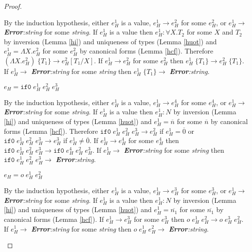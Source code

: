 \begin{hps}
\begin{proof}
\begin{hps-case-8}
By the induction hypothesis, either $e_{H}^{1}$ is a value, $e_{H}^{1}\rightarrow e_{H}^{2}$ for some $e_{H}^{2}$, or $e_{H}^{1}\rightarrow$ \emph{\textbf{Error}:\;string} for some \emph{string}.  If $e_{H}^{1}$ is a value then $e_{H}^{1}:\forall X.T_{2}$ for some $X$ and $T_{2}$ by inversion (Lemma \ref{hi}) and uniqueness of types (Lemma \ref{huot}) and $e_{H}^{1}=\Lambda X.e_{H}^{2}$ for some $e_{H}^{2}$ by canonical forms (Lemma \ref{hcf}).  Therefore $(\Lambda X.e_{H}^{2})\;\lbrace T_{1}\rbrace\rightarrow e_{H}^{2}[T_{1}/X]$.  If $e_{H}^{1}\rightarrow e_{H}^{2}$ for some $e_{H}^{2}$ then $e_{H}^{1}\;\lbrace T_{1}\rbrace\rightarrow e_{H}^{2}\;\lbrace T_{1}\rbrace$.  If $e_{H}^{1}\rightarrow$ \emph{\textbf{Error}:\;string} for some \emph{string} then $e_{H}^{1}\;\lbrace T_{1}\rbrace\rightarrow$ \emph{\textbf{Error}:\;string}.
\end{hps-case-8}
\begin{hps-case-9}
$e_{H}=\mathtt{if0}\;e_{H}^{1}\;e_{H}^{2}\;e_{H}^{3}$

By the induction hypothesis, either $e_{H}^{1}$ is a value, $e_{H}^{1}\rightarrow e_{H}^{4}$ for some $e_{H}^{4}$, or $e_{H}^{1}\rightarrow$ \emph{\textbf{Error}:\;string} for some \emph{string}.  If $e_{H}^{1}$ is a value then $e_{H}^{1}:N$ by inversion (Lemma \ref{hi}) and uniqueness of types (Lemma \ref{huot}) and $e_{H}^{1}=\overline{n}$ for some $\overline{n}$ by canonical forms (Lemma \ref{hcf}).  Therefore $\mathtt{if0}\;e_{H}^{1}\;e_{H}^{2}\;e_{H}^{3}\rightarrow e_{H}^{2}$ if $e_{H}^{1}=\overline{0}$ or $\mathtt{if0}\;e_{H}^{1}\;e_{H}^{2}\;e_{H}^{3}\rightarrow e_{H}^{3}$ if $e_{H}^{1}\neq\overline{0}$.  If $e_{H}^{1}\rightarrow e_{H}^{4}$ for some $e_{H}^{4}$ then $\mathtt{if0}\;e_{H}^{1}\;e_{H}^{2}\;e_{H}^{3}\rightarrow \mathtt{if0}\;e_{H}^{4}\;e_{H}^{2}\;e_{H}^{3}$.  If $e_{H}^{1}\rightarrow$ \emph{\textbf{Error}:\;string} for some \emph{string} then $\mathtt{if0}\;e_{H}^{1}\;e_{H}^{2}\;e_{H}^{3}\rightarrow$ \emph{\textbf{Error}:\;string}.
\end{hps-case-9}
\begin{hps-case-10}
$e_{H}=o\;e_{H}^{1}\;e_{H}^{2}$

By the induction hypothesis, either $e_{H}^{1}$ is a value, $e_{H}^{1}\rightarrow e_{H}^{3}$ for some $e_{H}^{3}$, or $e_{H}^{1}\rightarrow$ \emph{\textbf{Error}:\;string} for some \emph{string}.  If $e_{H}^{1}$ is a value then $e_{H}^{1}:N$ by inversion (Lemma \ref{hi}) and uniqueness of types (Lemma \ref{huot}) and $e_{H}^{1}=\overline{n_{1}}$ for some $\overline{n_{1}}$ by canonical forms (Lemma \ref{hcf}).  If $e_{H}^{1}\rightarrow e_{H}^{3}$ for some $e_{H}^{3}$ then $o\;e_{H}^{1}\;e_{H}^{2}\rightarrow o\;e_{H}^{3}\;e_{H}^{2}$.  If $e_{H}^{1}\rightarrow$ \emph{\textbf{Error}:\;string} for some \emph{string} then $o\;e_{H}^{1}\;e_{H}^{2}\rightarrow$ \emph{\textbf{Error}:\;string}.


\end{hps-case-10}
\end{proof}
\end{hps}
